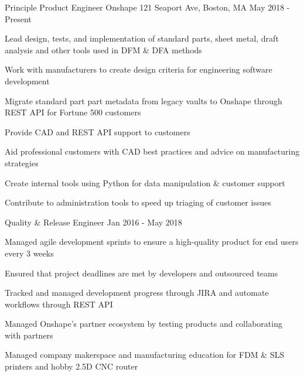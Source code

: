

\begin{cventries}

  \cventry
    {Principle Product Engineer} %
    {Onshape} %
    {121 Seaport Ave, Boston, MA} %
    {May 2018 - Present} %
    {
      \begin{cvitems} %
        \item {Lead design, tests, and implementation of standard parts, sheet metal, draft analysis and other tools used in DFM \& DFA methods}
        \item {Work with manufacturers to create design criteria for engineering software development}
        \item {Migrate standard part part metadata from legacy vaults to Onshape through REST API for Fortune 500 customers}
        \item {Provide CAD and REST API support to customers}
        \item {Aid professional customers with CAD best practices and advice on manufacturing strategies}
        \item {Create internal tools using Python for data manipulation \& customer support}
        \item {Contribute to administration tools to speed up triaging of customer issues}
      \end{cvitems}
    }

  \cventry
    {Quality \& Release Engineer} %
    {} %
    {} %
    {Jan 2016 - May 2018} %
    {
      \begin{cvitems} %
        \item {Managed agile development sprints to ensure a high-quality product for end users every 3 weeks}
        \item {Ensured that project deadlines are met by developers and outsourced teams}
        \item {Tracked and managed development progress through JIRA and automate workflows through REST API}
        \item {Managed Onshape’s partner ecosystem by testing products and collaborating with partners}
        \item {Managed company makerspace and manufacturing education for FDM \& SLS printers and hobby 2.5D CNC router} 
      \end{cvitems}
    }


\end{cventries}
